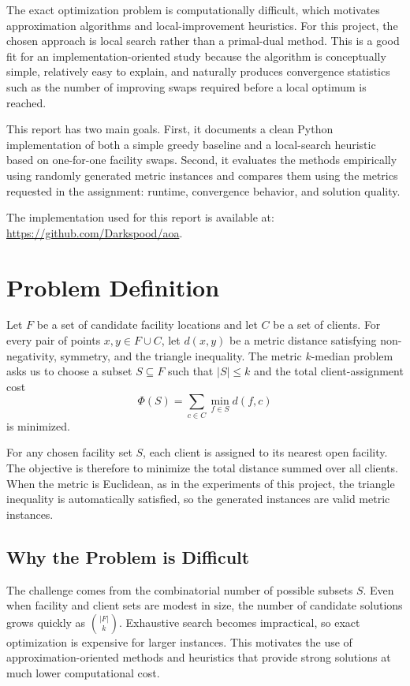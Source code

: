 \documentclass[11pt]{article}
\begin{document}
The exact optimization problem is computationally difficult, which motivates approximation algorithms and local-improvement heuristics. For this project, the chosen approach is local search rather than a primal-dual method. This is a good fit for an implementation-oriented study because the algorithm is conceptually simple, relatively easy to explain, and naturally produces convergence statistics such as the number of improving swaps required before a local optimum is reached.

This report has two main goals. First, it documents a clean Python implementation of both a simple greedy baseline and a local-search heuristic based on one-for-one facility swaps. Second, it evaluates the methods empirically using randomly generated metric instances and compares them using the metrics requested in the assignment: runtime, convergence behavior, and solution quality.

The implementation used for this report is available at: \url{https://github.com/Darkspood/aoa}.

\section{Problem Definition}
Let $F$ be a set of candidate facility locations and let $C$ be a set of clients. For every pair of points $x, y \in F \cup C$, let $d(x,y)$ be a metric distance satisfying non-negativity, symmetry, and the triangle inequality. The metric $k$-median problem asks us to choose a subset $S \subseteq F$ such that $|S| \leq k$ and the total client-assignment cost
\[
\Phi(S) = \sum_{c \in C} \min_{f \in S} d(f,c)
\]
is minimized.

For any chosen facility set $S$, each client is assigned to its nearest open facility. The objective is therefore to minimize the total distance summed over all clients. When the metric is Euclidean, as in the experiments of this project, the triangle inequality is automatically satisfied, so the generated instances are valid metric instances.

\subsection{Why the Problem is Difficult}
The challenge comes from the combinatorial number of possible subsets $S$. Even when facility and client sets are modest in size, the number of candidate solutions grows quickly as $\binom{|F|}{k}$. Exhaustive search becomes impractical, so exact optimization is expensive for larger instances. This motivates the use of approximation-oriented methods and heuristics that provide strong solutions at much lower computational cost.
\end{document}
